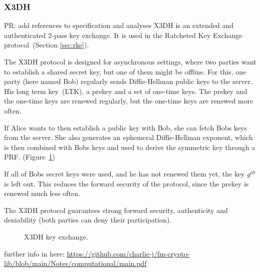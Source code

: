 \subsubsection{X3DH}
\alert{PR: add references to specification and analyses}
X3DH is an extended and authenticated 2-pass key exchange. 
It is used in the Ratcheted Key Exchange protocol~(Section \ref{sec:rke}).

The X3DH protocol is designed for asynchronous settings, where two parties want to establish a shared secret key, but one of them might be offline.
For this, one party (here named Bob) regularly sends Diffie-Hellman public keys to the server.
His long term key~(LTK), a prekey and a set of one-time keys. 
The prekey and the one-time keys are renewed regularly, but the one-time keys are renewed more often.

If Alice wants to then establish a public key with Bob, she can fetch Bobs keys from the server.
She also generates an ephemeral Diffie-Hellman exponent, which is then combined with Bobs keys and used to derive the symmetric key through a PRF. (Figure~\ref{fig:ake:x3dh})

If all of Bobs secret keys were used, and he has not renewed them yet, the key $g^{ab}$ is left out.
This reduces the forward security of the protocol, since the prekey is renewed much less often.

The X3DH protocol guarantees strong forward security, authenticity and deniability (both parties can deny their participation).

\begin{figure}[!ht]
    \centering
    
    \caption{X3DH key exchange.}
    \label{fig:ake:x3dh}
\end{figure}

\alert{further info in here: \url{https://github.com/charlie-j/fm-crypto-lib/blob/main/Notes/computational/main.pdf}}
